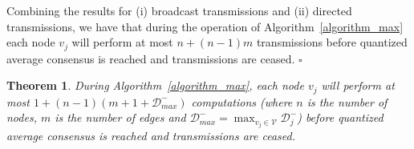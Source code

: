 \documentclass[twocolumn]{autart}    %
\newtheorem{theorem}{Theorem}
\newtheorem{remark}{Remark}
\newcommand{\todo}[1]{\textcolor{red}{{#1}}}
\begin{document}
\begin{pf}
Combining the results for (i) broadcast transmissions and (ii) directed transmissions, we have that during the operation of Algorithm~\ref{algorithm_max} each node $v_j$ will perform at most $n + (n-1)m$ transmissions before quantized average consensus is reached and transmissions are ceased. \hspace*{\fill} $\square$
\end{pf}







\begin{theorem}\label{bound_comp}
During Algorithm~\ref{algorithm_max}, each node $v_j$ will perform at most $1 + (n-1) (m + 1 + \mathcal{D}_{max}^-)$ computations (where $n$ is the number of nodes, $m$ is the number of edges and $\mathcal{D}_{max}^- = \max_{v_j \in \mathcal{V}} \mathcal{D}_j^-$) before quantized average consensus is reached and transmissions are ceased.
\end{theorem}
\end{document}
